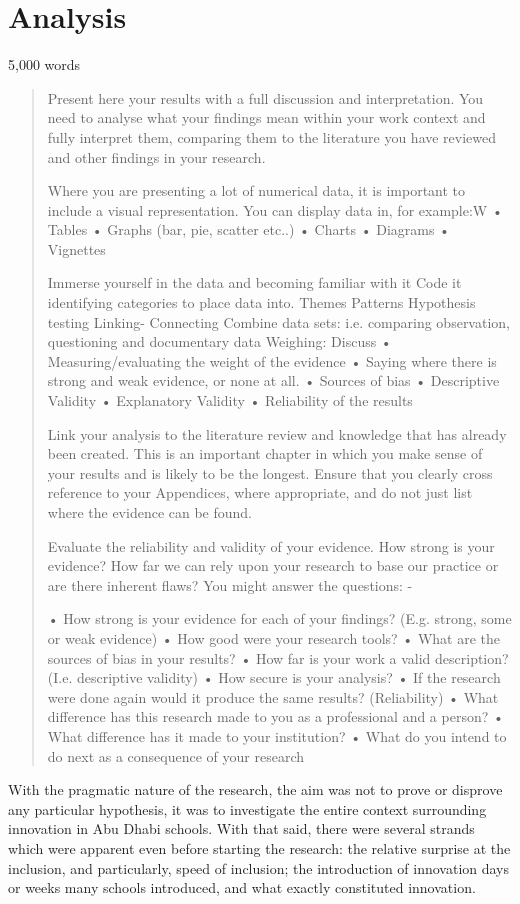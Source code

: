 \section{Analysis}
5,000 words
\begin{quote}
Present here your results with a full discussion and interpretation. You need to analyse what your findings mean within your work context and fully interpret them, comparing them to the literature you have reviewed and other findings in your research.

Where you are presenting a lot of numerical data, it is important to include a visual representation. You can display data in, for example:W
•	Tables
•	Graphs (bar, pie, scatter etc..)
•	Charts 
•	Diagrams
•	Vignettes

Immerse yourself in the data and becoming familiar with it
Code it 	identifying categories to place data into.
Themes
Patterns
Hypothesis testing
Linking- Connecting
Combine data sets: i.e. comparing observation, questioning and documentary data
Weighing: Discuss
•	Measuring/evaluating the weight of the evidence
•	Saying where there is strong and weak evidence, or none at all. 
•	Sources of bias
•	Descriptive Validity
•	Explanatory Validity
•	Reliability of the results

Link your analysis to the literature review and knowledge that has already been created. This is an important chapter in which you make sense of your results and is likely to be the longest. Ensure that you clearly cross reference to your Appendices, where appropriate, and do not just list where the evidence can be found.

Evaluate the reliability and validity of your evidence. How strong is your evidence?  How far we can rely upon your research to base our practice or are there inherent flaws? You might answer the questions: -

•	How strong is your evidence for each of your findings? (E.g. strong, some or weak evidence) 
•	How good were your research tools?
•	What are the sources of bias in your results?
•	How far is your work a valid description? (I.e. descriptive validity)
•	How secure is your analysis? 
•	If the research were done again would it produce the same results? (Reliability)
•	What difference has this research made to you as a professional and a person?
•	What difference has it made to your institution?
•	What do you intend to do next as a consequence of your research
\end{quote}
With the pragmatic nature of the research, the aim was not to prove or disprove any particular hypothesis, it was to investigate the entire context surrounding innovation in Abu Dhabi schools. With that said, there were several strands which were apparent even before starting the research: the relative surprise at the inclusion, and particularly, speed of inclusion; the introduction of innovation days or weeks many schools introduced, and what exactly constituted innovation.

